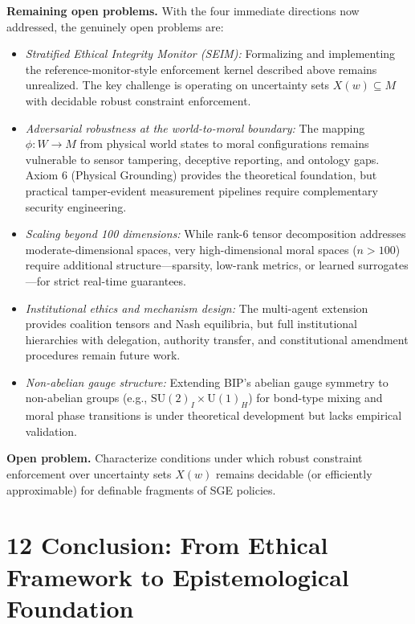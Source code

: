 \documentclass[12pt]{article}
\theoremstyle{plain}
\theoremstyle{definition}
\theoremstyle{remark}
\begin{document}
\textbf{Remaining open problems.} With the four immediate directions now addressed, the genuinely open problems are:

\begin{itemize}
\item \emph{Stratified Ethical Integrity Monitor (SEIM):} Formalizing and implementing the reference-monitor-style enforcement kernel described above remains unrealized. The key challenge is operating on uncertainty sets \(X(w) \subseteq M\) with decidable robust constraint enforcement.
\item \emph{Adversarial robustness at the world-to-moral boundary:} The mapping \(\phi: W \rightarrow M\) from physical world states to moral configurations remains vulnerable to sensor tampering, deceptive reporting, and ontology gaps. Axiom 6 (Physical Grounding) provides the theoretical foundation, but practical tamper-evident measurement pipelines require complementary security engineering.
\item \emph{Scaling beyond 100 dimensions:} While rank-6 tensor decomposition addresses moderate-dimensional spaces, very high-dimensional moral spaces (\(n > 100\)) require additional structure---sparsity, low-rank metrics, or learned surrogates---for strict real-time guarantees.
\item \emph{Institutional ethics and mechanism design:} The multi-agent extension provides coalition tensors and Nash equilibria, but full institutional hierarchies with delegation, authority transfer, and constitutional amendment procedures remain future work.
\item \emph{Non-abelian gauge structure:} Extending BIP's abelian gauge symmetry to non-abelian groups (e.g., \(\mathrm{SU}(2)_I \times \mathrm{U}(1)_H\)) for bond-type mixing and moral phase transitions is under theoretical development but lacks empirical validation.
\end{itemize}

\textbf{Open problem.} Characterize conditions under which robust
constraint enforcement over uncertainty sets \(X(w)\) remains decidable
(or efficiently approximable) for definable fragments of SGE policies.

\section{12 Conclusion: From Ethical Framework to Epistemological
Foundation}\label{conclusion-from-ethical-framework-to-epistemological-foundation}
\end{document}
